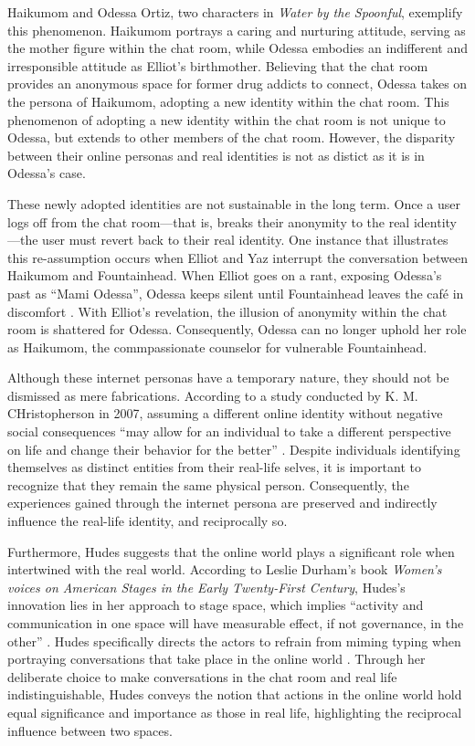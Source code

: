\documentclass{mla}
\begin{document}
Haikumom and Odessa Ortiz, two characters in \textit{Water by the Spoonful}, exemplify this phenomenon.
Haikumom portrays a caring and nurturing attitude, serving as the mother figure within the chat room, while Odessa embodies an indifferent and irresponsible attitude as Elliot's birthmother.
Believing that the chat room provides an anonymous space for former drug addicts to connect, Odessa takes on the persona of Haikumom, adopting a new identity within the chat room.
This phenomenon of adopting a new identity within the chat room is not unique to Odessa, but extends to other members of the chat room.
However, the disparity between their online personas and real identities is not as distict as it is in Odessa's case.

These newly adopted identities are not sustainable in the long term.
Once a user logs off from the chat room---that is, breaks their anonymity to the real identity---the user must revert back to their real identity.
One instance that illustrates this re-assumption occurs when Elliot and Yaz interrupt the conversation between Haikumom and Fountainhead.
When Elliot goes on a rant, exposing Odessa's past as ``Mami Odessa'', Odessa keeps silent until Fountainhead leaves the caf\'e in discomfort \autocite[55]{Hudes_2017}.
With Elliot's revelation, the illusion of anonymity within the chat room is shattered for Odessa.
Consequently, Odessa can no longer uphold her role as Haikumom, the commpassionate counselor for vulnerable Fountainhead.

Although these internet personas have a temporary nature, they should not be dismissed as mere fabrications.
According to a study conducted by K. M. CHristopherson in 2007, assuming a different online identity without negative social consequences ``may allow for an individual to take a different perspective on life and change their behavior for the better'' \autocite{Christopherson_2007}.
Despite individuals identifying themselves as distinct entities from their real-life selves, it is important to recognize that they remain the same physical person.
Consequently, the experiences gained through the internet persona are preserved and indirectly influence the real-life identity, and reciprocally so.

Furthermore, Hudes suggests that the online world plays a significant role when intertwined with the real world.
According to Leslie Durham's book \textit{Women's voices on American Stages in the Early Twenty-First Century}, Hudes's innovation lies in her approach to stage space, which implies ``activity and communication in one space will have measurable effect, if not governance, in the other'' \autocite[117--118]{Durham_2013}.
Hudes specifically directs the actors to refrain from miming typing when portraying conversations that take place in the online world \autocite[3]{Hudes_2017}.
Through her deliberate choice to make conversations in the chat room and real life indistinguishable, Hudes conveys the notion that actions in the online world hold equal significance and importance as those in real life, highlighting the reciprocal influence between two spaces.
\end{document}
